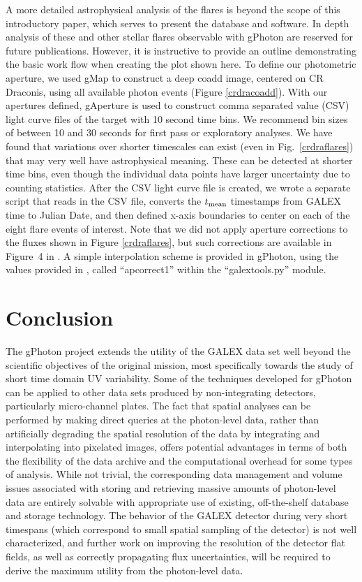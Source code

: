 \documentclass[iop]{emulateapj}
\begin{document}
A more detailed astrophysical analysis of the flares is beyond the scope of this introductory paper, which serves to present the database and software. In depth analysis of these and other stellar flares observable with gPhoton are reserved for future publications. However, it is instructive to provide an outline demonstrating the basic work flow when creating the plot shown here. To define our photometric aperture, we used gMap to construct a deep coadd image, centered on CR Draconis, using all available photon events (Figure \ref{crdracoadd}). With our apertures defined, gAperture is used to construct comma separated value (CSV) light curve files of the target with 10 second time bins. We recommend bin sizes of between 10 and 30 seconds for first pass or exploratory analyses. We have found that variations over shorter timescales can exist (even in Fig.\ \ref{crdraflares}) that may very well have astrophysical meaning. These can be detected at shorter time bins, even though the individual data points have larger uncertainty due to counting statistics. After the CSV light curve file is created, we wrote a separate script that reads in the CSV file, converts the $t_{\rm{mean}}$ timestamps from GALEX time to Julian Date, and then defined x-axis boundaries to center on each of the eight flare events of interest. Note that we did not apply aperture corrections to the fluxes shown in Figure \ref{crdraflares}, but such corrections are available in Figure\ 4 in \citet{mor2007}. A simple interpolation scheme is provided in gPhoton, using the values provided in \cite{mor2007}, called ``apcorrect1'' within the ``galextools.py'' module.

\section{Conclusion}
The gPhoton project extends the utility of the GALEX data set well beyond the scientific objectives of the original mission, most specifically towards the study of short time domain UV variability. Some of the techniques developed for gPhoton can be applied to other data sets produced by non-integrating detectors, particularly micro-channel plates. The fact that spatial analyses can be performed by making direct queries at the photon-level data, rather than artificially degrading the spatial resolution of the data by integrating and interpolating into pixelated images, offers potential advantages in terms of both the flexibility of the data archive and the computational overhead for some types of analysis. While not trivial, the corresponding data management and volume issues associated with storing and retrieving massive amounts of photon-level data are entirely solvable with appropriate use of existing, off-the-shelf database and storage technology. The behavior of the GALEX detector during very short timespans (which correspond to small spatial sampling of the detector) is not well characterized, and further work on improving the resolution of the detector flat fields, as well as correctly propagating flux uncertainties, will be required to derive the maximum utility from the photon-level data.
\end{document}
